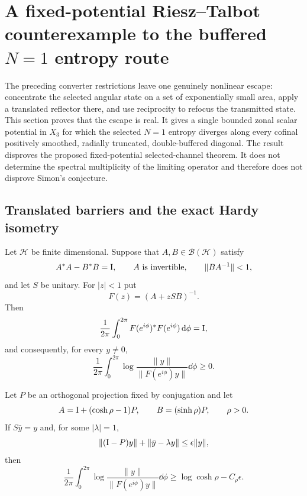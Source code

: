 \section{A fixed-potential Riesz--Talbot counterexample to the buffered
$N=1$ entropy route}
\label{app:riesz-talbot-fixed-counterexample}

The preceding converter restrictions leave one genuinely nonlinear escape:
concentrate the selected angular state on a set of exponentially small area,
apply a translated reflector there, and use reciprocity to refocus the
transmitted state.  This section proves that the escape is real.  It gives a
single bounded zonal scalar potential in $X_3$ for which the selected
$N=1$ entropy diverges along every cofinal positively smoothed, radially
truncated, double-buffered diagonal.  The result disproves the proposed
fixed-potential selected-channel theorem.  It does not determine the spectral
multiplicity of the limiting operator and therefore does not disprove Simon's
conjecture.

\subsection{Translated barriers and the exact Hardy isometry}

\begin{lemma}
\label{lem:translated-barrier-hardy}
Let $\mathcal H$ be finite dimensional.  Suppose that $A,B\in
\mathcal B(\mathcal H)$ satisfy
\begin{equation}
 A^*A-B^*B=\mathrm I,\qquad A\text{ is invertible},\qquad
 \|BA^{-1}\|<1,
 \label{eq:barrier-flux-data}
\end{equation}
and let $S$ be unitary.  For $|z|<1$ put
\begin{equation}
 F(z)=(A+zSB)^{-1}.
 \label{eq:barrier-hardy-function}
\end{equation}
Then
\begin{equation}
 \frac1{2\pi}\int_0^{2\pi}
 F(e^{i\phi})^*F(e^{i\phi})\,\mathrm d\phi=\mathrm I,
 \label{eq:barrier-hardy-isometry}
\end{equation}
and consequently, for every $y\ne0$,
\begin{equation}
 \frac1{2\pi}\int_0^{2\pi}
 \log\frac{\|y\|}{\|F(e^{i\phi})y\|}\dd\phi\geq0.
 \label{eq:barrier-hardy-nonnegative-loss}
\end{equation}

Let $P$ be an orthogonal projection fixed by conjugation and let
\begin{equation}
 A=\mathrm I+(\cosh\rho-1)P,\qquad B=(\sinh\rho)P,\qquad \rho>0.
 \label{eq:localized-hyperbolic-barrier}
\end{equation}
If $S\bar y=y$ and, for some $|\lambda|=1$,
\begin{equation}
 \|(\mathrm I-P)y\|+\|\bar y-\lambda y\|
 \leq\epsilon\|y\|,
 \label{eq:localized-phase-real-state}
\end{equation}
then
\begin{equation}
 \frac1{2\pi}\int_0^{2\pi}
 \log\frac{\|y\|}{\|F(e^{i\phi})y\|}\dd\phi
 \geq\log\cosh\rho-C_\rho\epsilon.
 \label{eq:localized-barrier-positive-loss}
\end{equation}
\end{lemma}

